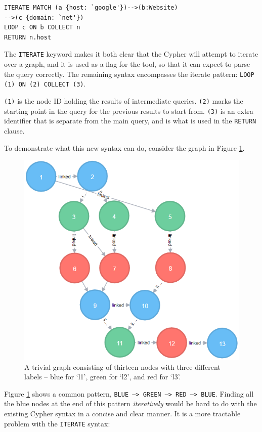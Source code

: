 \documentclass[letterpaper]{ltxdoc}
\begin{document}
\begin{lstlisting}[language=Cypher]
ITERATE MATCH (a {host: `google'})-->(b:Website)
-->(c {domain: `net'})
LOOP c ON b COLLECT n
RETURN n.host
\end{lstlisting}

The \texttt{ITERATE} keyword makes it both clear that the Cypher will attempt to iterate over a graph, and it is used as a flag for the tool, so that it can expect to parse the query correctly. The remaining syntax encompasses the iterate pattern: \texttt{LOOP (1) ON (2) COLLECT (3)}.

\texttt{(1)} is the node ID holding the results of intermediate queries. \texttt{(2)} marks the starting point in the query for the previous results to start from. \texttt{(3)} is an extra identifier that is separate from the main query, and is what is used in the \texttt{RETURN} clause.

To demonstrate what this new syntax can do, consider the graph in Figure \ref{iterGraphFig}.

\begin{figure}[h]
\centerline{\includegraphics[scale=0.7]{iterateGraph.png}}
\caption{A trivial graph consisting of thirteen nodes with three different labels -- blue for `l1', green for `l2', and red for `l3'.}
\label{iterGraphFig}
\end{figure}

\newpage
Figure \ref{iterGraphFig} shows a common pattern, \texttt{BLUE --> GREEN --> RED --> BLUE}. Finding all the blue nodes at the end of this pattern \emph{iteratively} would be hard to do with the existing Cypher syntax in a concise and clear manner. It is a more tractable problem with the \texttt{ITERATE} syntax:
\end{document}
